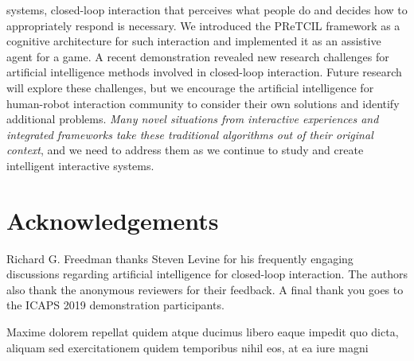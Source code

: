 \documentclass[letterpaper]{article} %
\begin{document}
\noindent systems, closed-loop interaction that perceives what people do and decides how to appropriately respond is necessary.  We introduced the {\sc PReTCIL} framework as a cognitive architecture for such interaction and implemented it as an assistive agent for a game.  A recent demonstration %
revealed new research challenges for artificial intelligence methods involved in closed-loop interaction. %
Future research will explore these challenges, but we encourage the artificial intelligence for human-robot interaction community to consider their own solutions and identify additional problems.  \textit{Many novel situations from interactive experiences and integrated frameworks take these traditional algorithms out of their original context}, and we need to address them as we continue to study and create intelligent interactive systems.

\section*{Acknowledgements} Richard G. Freedman thanks Steven Levine for his frequently engaging discussions regarding artificial intelligence for closed-loop interaction.  The authors also thank the anonymous reviewers for their feedback.  A final thank you goes to the ICAPS 2019 demonstration participants.  %

Maxime dolorem repellat quidem atque ducimus libero eaque impedit quo dicta, aliquam sed exercitationem quidem temporibus nihil eos, at ea iure magni


\end{document}
